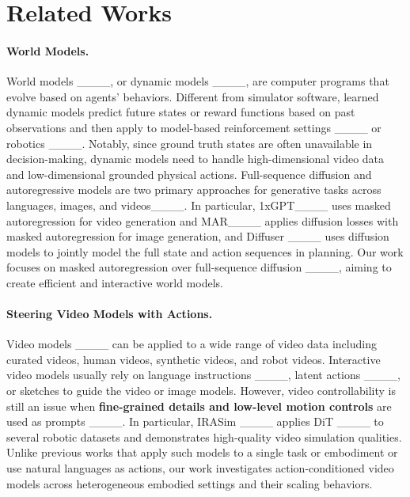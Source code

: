 \section{Related Works}
\label{sec:related_works}

\paragraph{World Models.}
 World models ____, or dynamic models ____, are computer programs that evolve based on agents' behaviors. Different from simulator software, learned dynamic models predict future states or reward functions based on past observations and then apply to model-based reinforcement settings ____ or robotics ____. Notably, since ground truth states are often unavailable in decision-making, dynamic models need to handle high-dimensional video data and low-dimensional grounded physical actions. Full-sequence diffusion and autoregressive models are two primary approaches for generative tasks across languages, images, and videos____. In particular, 1xGPT____ uses masked autoregression for video generation and MAR____ applies diffusion losses with masked autoregression for image generation, and Diffuser ____ uses diffusion models to jointly model the full state and action sequences in planning. Our work focuses on masked autoregression over full-sequence diffusion ____, aiming to create efficient and interactive world models.
 
\paragraph{Steering Video Models with Actions.}
Video models ____ can be applied to a wide range of video data including curated videos, human videos, synthetic videos, and robot videos. Interactive video models usually rely on language instructions ____, latent actions ____, or sketches to guide the video or image models.  However, video controllability is still an issue when \textbf{fine-grained details and low-level motion controls} are  used as prompts ____. In particular, IRASim ____ applies DiT ____ to several robotic datasets and demonstrates high-quality video simulation qualities. Unlike previous works that apply such models to a single task or embodiment or use natural languages as actions, our work investigates action-conditioned video models across heterogeneous embodied settings and their scaling behaviors.  

